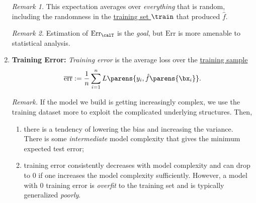 \documentclass[12pt]{article}
\begin{document}
\begin{enumerate}[label=\textbf{\arabic*.}]
	\textit{Remark 1.} This expectation averages over \textit{everything} that is random, including the randomness in the \underline{training set $\train$} that produced $\hat{f}$. 
	
	\textit{Remark 2.} Estimation of $\mathrm{Err}_{\calT}$ is the \emph{goal}, but $\mathrm{Err}$ is more amenable to statistical analysis. 
	
	\item \textbf{Training Error:} \emph{Training error} is the average loss over the \underline{training sample}
	\begin{align}
		\overline{\mathrm{err}} := \frac{1}{n} \sum_{i=1}^n L \parens{y_i, \hat{f} \parens{\bx_i}}. 
	\end{align}

	\textit{Remark.} If the model we build is getting increasingly complex, we use the training dataset more to exploit the complicated underlying structures. Then, 
	\begin{enumerate}
		\item there is a tendency of lowering the bias and increasing the variance. There is some \emph{intermediate} model complexity that gives the minimum expected test error; 
		\item training error consistently decreases with model complexity and can drop to 0 if one increases the model complexity sufficiently. However, a model with 0 training error is \emph{overfit} to the training set and is typically generalized \emph{poorly}. 
	\end{enumerate}
	

\end{enumerate}
\end{document}

